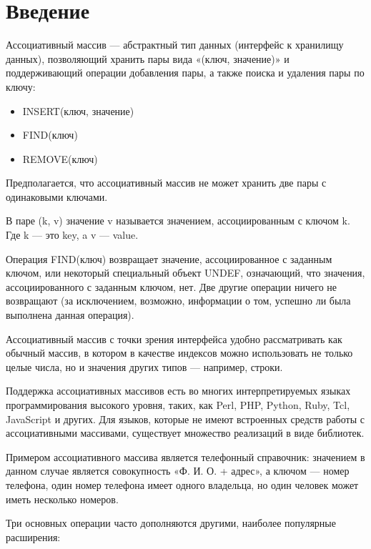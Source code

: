 \documentclass[12pt,a4paper]{report}
\begin{document}

\tableofcontents

	
\newpage
\chapter*{Введение}


Ассоциативный массив — абстрактный тип данных (интерфейс к хранилищу данных), позволяющий хранить пары вида «(ключ, значение)» и поддерживающий операции добавления пары, а также поиска и удаления пары по ключу:

\begin{itemize}
	\item INSERT(ключ, значение)
	\item FIND(ключ)
	\item REMOVE(ключ)
\end{itemize}

Предполагается, что ассоциативный массив не может хранить две пары с одинаковыми ключами.

В паре (k, v) значение v называется значением, ассоциированным с ключом k. Где k — это key, a v — value. 

Операция FIND(ключ) возвращает значение, ассоциированное с заданным ключом, или некоторый специальный объект UNDEF, означающий, что значения, ассоциированного с заданным ключом, нет. Две другие операции ничего не возвращают (за исключением, возможно, информации о том, успешно ли была выполнена данная операция).

Ассоциативный массив с точки зрения интерфейса удобно рассматривать как обычный массив, в котором в качестве индексов можно использовать не только целые числа, но и значения других типов — например, строки.

Поддержка ассоциативных массивов есть во многих интерпретируемых языках программирования высокого уровня, таких, как Perl, PHP, Python, Ruby, Tcl, JavaScript и других. Для языков, которые не имеют встроенных средств работы с ассоциативными массивами, существует множество реализаций в виде библиотек.

Примером ассоциативного массива является телефонный справочник: значением в данном случае является совокупность «Ф. И. О. + адрес», а ключом — номер телефона, один номер телефона имеет одного владельца, но один человек может иметь несколько номеров.

Три основных операции часто дополняются другими, наиболее популярные расширения:
\end{document}
